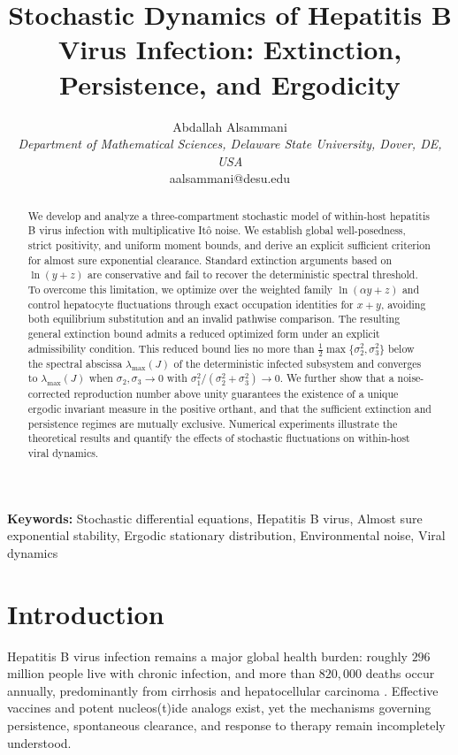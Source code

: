 \documentclass{article}
\title{Stochastic Dynamics of Hepatitis B Virus Infection: Extinction, Persistence, and Ergodicity}
\author{
 Abdallah Alsammani\\
  \textit{Department of Mathematical Sciences, Delaware State University, Dover, DE, USA} \\
  aalsammani@desu.edu
}
\date{}
\newcommand{\keywords}[1]{\textbf{Keywords:} #1}
\begin{document}
\maketitle

\begin{abstract}
\noindent We develop and analyze a three-compartment stochastic model of within-host hepatitis B virus infection with multiplicative It\^o noise. We establish global well-posedness, strict positivity, and uniform moment bounds, and derive an explicit sufficient criterion for almost sure exponential clearance. Standard extinction arguments based on $\ln(y+z)$ are conservative and fail to recover the deterministic spectral threshold. To overcome this limitation, we optimize over the weighted family $\ln(\alpha y+z)$ and control hepatocyte fluctuations through exact occupation identities for $x+y$, avoiding both equilibrium substitution and an invalid pathwise comparison. The resulting general extinction bound admits a reduced optimized form under an explicit admissibility condition. This reduced bound lies no more than $\tfrac12\max\{\sigma_2^2,\sigma_3^2\}$ below the spectral abscissa $\lambda_{\max}(J)$ of the deterministic infected subsystem and converges to $\lambda_{\max}(J)$ when $\sigma_2,\sigma_3\to0$ with $\sigma_1^2/(\sigma_2^2+\sigma_3^2)\to0$. We further show that a noise-corrected reproduction number above unity guarantees the existence of a unique ergodic invariant measure in the positive orthant, and that the sufficient extinction and persistence regimes are mutually exclusive. Numerical experiments illustrate the theoretical results and quantify the effects of stochastic fluctuations on within-host viral dynamics.
\end{abstract}

\keywords{Stochastic differential equations, Hepatitis B virus, Almost sure exponential stability, Ergodic stationary distribution, Environmental noise, Viral dynamics}

\section{Introduction}\label{sec:intro}

Hepatitis B virus infection remains a major global health burden: roughly $296$ million people live with chronic infection, and more than $820{,}000$ deaths occur annually, predominantly from cirrhosis and hepatocellular carcinoma \citep{WHO2023}. Effective vaccines and potent nucleos(t)ide analogs exist, yet the mechanisms governing persistence, spontaneous clearance, and response to therapy remain incompletely understood.
\end{document}
